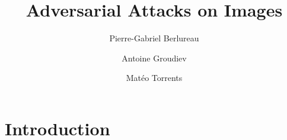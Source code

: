 \documentclass{../cs-classes/cs-classes}
\title{Adversarial Attacks on Images}
\author{Pierre-Gabriel Berlureau\and Antoine Groudiev\and Matéo Torrents}
\begin{document}
\section{Introduction}

\nocite{*}
\printbibliography
\end{document}
